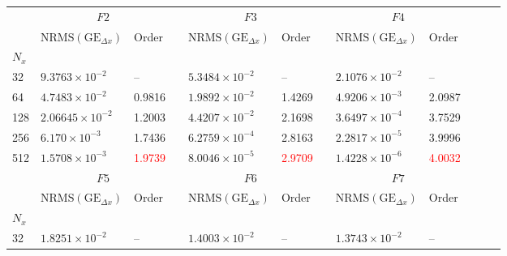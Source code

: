 \documentclass{beamer}
\begin{document}

\begin{frame}

\newcommand\Fontvi{\fontsize{5}{7.2}\selectfont}
\Fontvi
 
\begin{tabular}{@{}lllcllcllcll@{}}\toprule[2 pt]
&\multicolumn{2}{c}{$F2$} & \phantom{a} & \multicolumn{2}{c}{$F3$} &
\phantom{a} & \multicolumn{2}{c}{$F4$} & \\
\cmidrule{2-3} \cmidrule{5-6} \cmidrule{8-9} 
& $\text{NRMS}(\text{GE}_{\Delta x})$ & Order && $\text{NRMS}(\text{GE}_{\Delta x})$ & Order && $\text{NRMS}(\text{GE}_{\Delta x})$ & Order   & \\
\midrule
\phantom{a}$N_x$ \\
\phantom{a}32	&	$9.3763\times 10^{-2}$	&	--	                 	&&	$5.3484\times 10^{-2}$	&	--               		&&	$2.1076\times 10^{-2}$	&	--              		\\
\phantom{a}64	&	$4.7483\times 10^{-2}$	&	0.9816	                 	&&	$1.9892\times 10^{-2}$	&	1.4269           		&&	$4.9206\times 10^{-3}$	&	2.0987            		\\
\phantom{a}128	&	$2.06645\times 10^{-2}$	&	1.2003	                	&&	$4.4207\times 10^{-2}$	&	2.1698		                &&	$3.6497\times 10^{-4}$	&	3.7529            	        \\
\phantom{a}256	&	$6.170\times 10^{-3}$	&	1.7436           		&&	$6.2759\times 10^{-4}$	&	2.8163          		&&	$2.2817\times 10^{-5}$	&	3.9996                          \\
\phantom{a}512	&	$1.5708\times 10^{-3}$	&	\textcolor{red}{1.9739}		&&	$8.0046\times 10^{-5}$	&	\textcolor{red}{2.9709}		&&	$1.4228\times 10^{-6}$	&	\textcolor{red}{4.0032}	        \\	
\midrule
&\multicolumn{2}{c}{$F5$} & \phantom{abc} & \multicolumn{2}{c}{$F6$} &
\phantom{abc} & \multicolumn{2}{c}{$F7$} & \\
\cmidrule{2-3} \cmidrule{5-6} \cmidrule{8-9} 
& $\text{NRMS}(\text{GE}_{\Delta x})$ & Order && $\text{NRMS}(\text{GE}_{\Delta x})$ & Order && $\text{NRMS}(\text{GE}_{\Delta x})$ & Order  & \\
\midrule
\phantom{a}$N_x$ \\
\phantom{a}32	& $1.8251\times 10^{-2}$	&	--	                        && $1.4003\times 10^{-2}$	&	--              		&&	$1.3743\times 10^{-2}$	&	--                 		\\

\end{tabular}
\end{frame}
\end{document}
